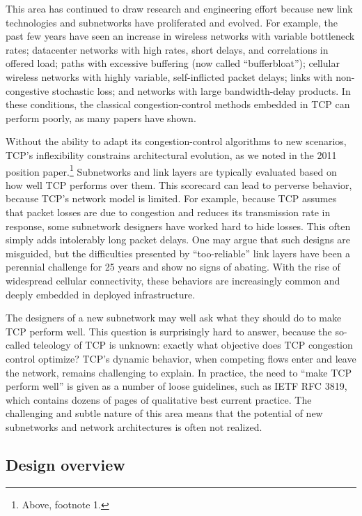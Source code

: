 \documentclass{article}
\begin{document}
This area has continued to draw research and engineering effort
because new link technologies and subnetworks have proliferated and
evolved. For example, the past few years have seen an increase in
wireless networks with variable bottleneck rates; datacenter networks
with high rates, short delays, and correlations in offered load; paths
with excessive buffering (now called ``bufferbloat''); cellular
wireless networks with highly variable, self-inflicted packet delays;
links with non-congestive stochastic loss; and networks with large
bandwidth-delay products. In these conditions, the classical
congestion-control methods embedded in TCP can perform poorly, as many
papers have shown.

Without the ability to adapt its congestion-control algorithms to new
scenarios, TCP's inflexibility constrains architectural evolution, as
we noted in the 2011 position paper.\footnote{Above, footnote 1.}
Subnetworks and link layers are typically evaluated based on how well
TCP performs over them.  This scorecard can lead to perverse behavior,
because TCP's network model is limited. For example, because TCP
assumes that packet losses are due to congestion and reduces its
transmission rate in response, some subnetwork designers have worked
hard to hide losses. This often simply adds intolerably long packet
delays. One may argue that such designs are misguided, but the
difficulties presented by ``too-reliable'' link layers have been a
perennial challenge for 25 years and show no signs of abating. With
the rise of widespread cellular connectivity, these behaviors are
increasingly common and deeply embedded in deployed infrastructure.

The designers of a new subnetwork may well ask what they should do to
make TCP perform well. This question is surprisingly hard to answer,
because the so-called teleology of TCP is unknown: exactly what
objective does TCP congestion control optimize? TCP's dynamic
behavior, when competing flows enter and leave the network, remains
challenging to explain.  In practice, the need to ``make
TCP perform well'' is given as a number of loose guidelines, such as
IETF RFC 3819, which contains dozens of pages of
qualitative best current practice. The challenging and subtle nature
of this area means that the potential of new subnetworks and network
architectures is often not realized.

\subsection*{Design overview}
\end{document}
